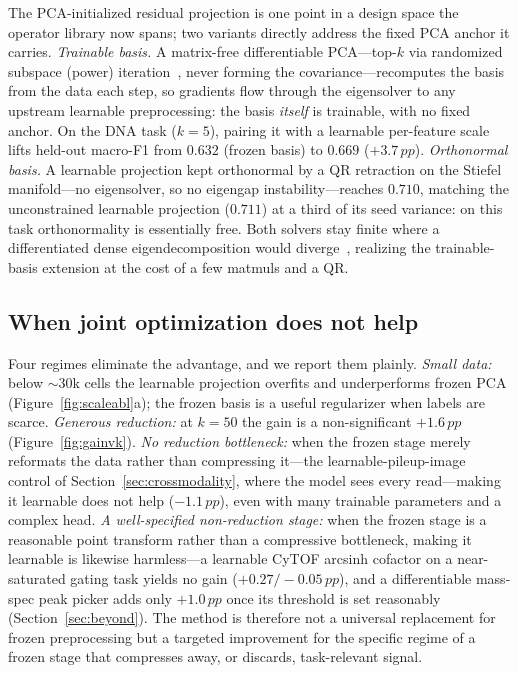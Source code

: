\documentclass[10pt,twocolumn]{article}
\newcommand{\pp}{\,pp}
\begin{document}
The PCA-initialized residual projection is one point in a design space the operator library
now spans; two variants directly address the fixed PCA anchor it carries.
\emph{Trainable basis.} A matrix-free differentiable PCA---top-$k$ via randomized subspace
(power) iteration~\citep{halko2011randomized}, never forming the covariance---recomputes the
basis from the data each step, so gradients flow through the eigensolver to any upstream
learnable preprocessing: the basis \emph{itself} is trainable, with no fixed anchor. On the
DNA task ($k{=}5$), pairing it with a learnable per-feature scale lifts held-out macro-F1
from $0.632$ (frozen basis) to $0.669$ ($+3.7\pp$). \emph{Orthonormal basis.} A learnable
projection kept orthonormal by a QR retraction on the Stiefel manifold---no eigensolver, so
no eigengap instability---reaches $0.710$, matching the unconstrained learnable projection
($0.711$) at a third of its seed variance: on this task orthonormality is essentially free.
Both solvers stay finite where a differentiated dense eigendecomposition would
diverge~\citep{wang2019backprop}, realizing the trainable-basis extension at the cost of a
few matmuls and a QR.

\subsection{When joint optimization does not help}

Four regimes eliminate the advantage, and we report them plainly. \emph{Small data:} below
$\sim$30k cells the learnable projection overfits and underperforms frozen PCA
(Figure~\ref{fig:scaleabl}a); the frozen basis is a useful regularizer when labels are
scarce. \emph{Generous reduction:} at $k{=}50$ the gain is a non-significant $+1.6\pp$
(Figure~\ref{fig:gainvk}). \emph{No reduction bottleneck:} when the frozen stage merely
reformats the data rather than compressing it---the learnable-pileup-image control of
Section~\ref{sec:crossmodality}, where the model sees every read---making it learnable does
not help ($-1.1\pp$), even with many trainable parameters and a complex head.
\emph{A well-specified non-reduction stage:} when the frozen stage is a reasonable point
transform rather than a compressive bottleneck, making it learnable is likewise harmless---a
learnable CyTOF arcsinh cofactor on a near-saturated gating task yields no gain
($+0.27/{-}0.05\pp$), and a differentiable mass-spec peak picker adds only $+1.0\pp$ once its
threshold is set reasonably (Section~\ref{sec:beyond}). The method is therefore not a universal
replacement for frozen preprocessing but a targeted improvement for the specific regime of a
frozen stage that compresses away, or discards, task-relevant signal.
\end{document}
